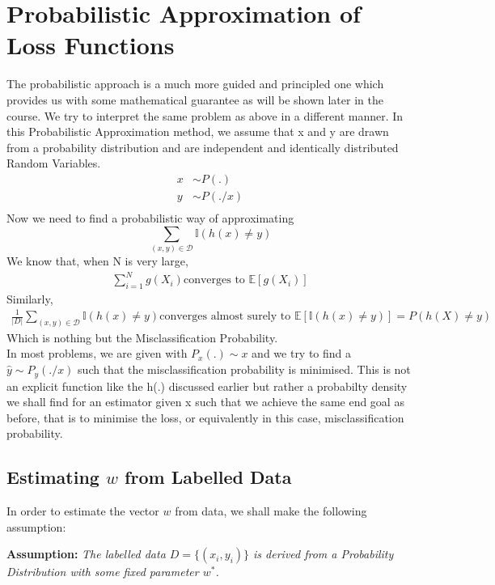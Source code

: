 \documentclass[11pt, twosides]{article}
\begin{document}
\section{Probabilistic Approximation of Loss Functions}
The probabilistic approach is a much more guided and principled one which provides us with some mathematical guarantee as will be shown later in the course. We try to interpret the same problem as above in a different manner. In this Probabilistic Approximation method, we assume that x and y are drawn from a probability distribution and are independent and identically distributed Random Variables.
\begin{align*}
     x &\sim P(.) \\
     y &\sim P(./x) \\
\end{align*}
Now we need to find a probabilistic way of approximating $$\sum_{(x,y)\in\mathcal{D}} \mathbb{I}\left(h(x)\ne y\right)$$
We know that, when N is very large, 
\begin{align*}
   \sum_{i=1}^{N}g\left(X_{i}\right) \text{converges to } \mathbb{E}[g(X_{i})]
\end{align*}
Similarly, 
\begin{align*}
    \frac{1}{|D|}\sum_{(x,y)\in\mathcal{D}} \mathbb{I}\left(h(x)\ne y\right) \text{converges almost surely to } \mathbb{E}[\mathbb{I}(h(x)\ne y)]  = P(h(X)\ne y)
\end{align*}
Which is nothing but the Misclassification Probability. \\
In most problems, we are given with $P_{x}(.)\sim x$ and we try to find a $\hat{y} \sim P_{y}(./x)$ such that the misclassification probability is minimised. This is not an explicit function like the h(.) discussed earlier but rather a probabilty density we shall find for an estimator given x such that we achieve the same end goal as before, that is to minimise the loss, or equivalently in this case, misclassification probability.
\subsection{Estimating $w$ from Labelled Data}

In order to estimate the vector $w$ from data, we shall make the following assumption:

\textbf{Assumption: }\textit{The labelled data $D = \{ (x_i, y_i) \} $ is derived from a Probability Distribution with some fixed parameter $w^*$.}
\end{document}
